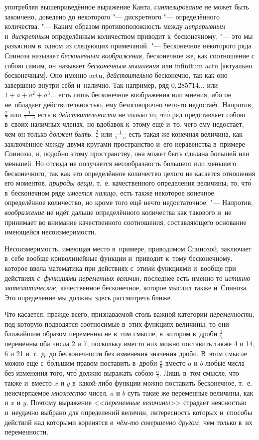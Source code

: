 употребляя вышеприведённое выражение Канта, {\em синтезирование} не может быть
закончено, доведено до некоторого "--- дискретного "--- определённого
количества. "--- Каким образом противоположность между {\em непрерывным}
и~{\em дискретным} определённым количеством приводит к~бесконечному, "--- это
мы разъясним в~одном из следующих примечаний. "--- Бесконечное некоторого ряда
Спиноза называет {\em бесконечным воображения,} бесконечное же, как соотношение
с собою самим, он называет {\em бесконечным мышления} или infi\-ni\-tum actu
[актуально бесконечным]. Оно именно actu, {\em действительно} бесконечно, так
как оно завершено внутри себя и~налично. Так например, ряд $0{,}285714\ldots$
или $1+a+a^2+a^3\ldots$ есть лишь бесконечное воображения или мнения, ибо он
не~обладает действительностью, ему безоговорочно чего-то недостаёт. Напротив,
$\frac 2 7$ или $\frac 1{1-a}$ есть в {\em действительности} не только то, чт\'{о} ряд
представляет собою в~своих наличных членах, но вдобавок к~этому ещё и~то, чего
ему недостаёт, чем он только {\em должен быть}. $\frac 2 7$ или $\frac 1{1-a}$
есть такая же конечная величина, как заключённое между двумя кругами
пространство и~его неравенства в~примере Спинозы, и, подобно этому
пространству, она может быть сделана большей или меньшей. Но отсюда не
получается несообразность большего или меньшего бесконечного, так как это
определённое количество целого не касается отношения его моментов,
{\em природы вещи,} т.~е. качественного определения величины; то, чт\'{о} в~бесконечном
ряде {\em имеется налицо,} есть также некоторое конечное определённое количество,
но кроме того ещё нечто недостаточное. "--- Напротив, {\em воображение} не идёт
дальше определённого количества как такового и~не принимает во внимание
качественного соотношения, составляющего основание имеющейся несоизмеримости.

Несоизмеримость, имеющая место в~примере, приводимом Спинозой, заключает в~себе
вообще криволинейные функции и~приводит к~тому бесконечному, которое ввела
математика при действиях с~этими функциями и~вообще при действиях
{\em с~функциями переменных величин;} последнее есть именно то
{\em истинно математическое,} качественное бесконечное, которое мыслил
также и~Спиноза. Это определение мы должны здесь рассмотреть ближе.

Что касается, прежде всего, признаваемой столь важной категории
{\em переменности,} под которую подводятся соотносимые в~этих функциях
величины, то они ближайшим образом переменны не в~том смысле, в~котором в~дроби
$\frac 2 7$ переменны оба числа 2 и 7, поскольку вместо них можно поставить
также 4 и 14, 6 и 21 и~т.~д. до бесконечности без изменения значения дроби.
В~этом смысле можно ещё с~б\'{о}льшим правом поставить в~дроби $\frac a b$ вместо
$a$ и $b$ любые числа без изменения того, чт\'{о} должно выражать собою
$\frac a b$. Лишь в~том смысле, что также и~вместо $x$ и $y$ в~какой-либо
функции можно поставить бесконечное, т.~е. неисчерпаемое {\em множество} чисел,
$a$ и $b$ суть такие же переменные величины, как и $x$ и $y$. Поэтому выражение
<<{\em переменные величины}>> страдает неясностью и~неудачно выбрано для
определений величин, интересность которых и~способы действий над которыми
коренятся {\em в~чём-то совершенно другом,} чем только в~их переменности.

